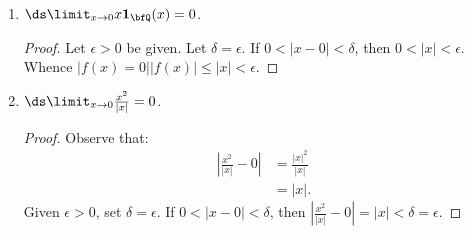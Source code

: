 \documentclass[11pt,twoside,openany]{memoir}
\begin{document}
\begin{exercise}
\begin{enumerate}[label = (\alph*)]
\begin{proof}
\begin{equation*}
\begin{split}
                                & = \left|\frac{x+1}{x+3}\right|\cdot |x-6|.
                            \end{split}
                            \end{equation*}
                        If $|x-6| < 1$, then $6 < x+1 < 8$ and $\frac{1}{8} > \frac{1}{x+1} > \frac{1}{11}$. Thus:
                            \begin{equation*}
                            \begin{split}
                                \left|\frac{x+1}{x+3}\right|\cdot |x-6| 
                                & < \frac{8}{8}|x-6| \\
                                & = |x-6|.
                            \end{split}
                            \end{equation*}
                        Formally, given $\epsilon > 0$, let $\delta = \min\{1,\epsilon\}$. If $0 < |x-6|< \delta$, then by the work above $|f(x) - L| < \epsilon$.
                    \end{proof}
                \item $\ds \limit_{x \rightarrow 0}x\mathbf{1}_\bfQ(x) = 0$.
                    \begin{proof}
                        Let $\epsilon > 0$ be given. Let $\delta = \epsilon$. If $0 < |x - 0| < \delta$, then $0 < |x| < \epsilon$. Whence $|f(x) = 0| |f(x)| \leq |x| < \epsilon$.
                    \end{proof}
                \item $\ds \limit_{x \rightarrow 0} \frac{x^2}{|x|} = 0$.
                    \begin{proof}
                        Observe that:
                            \begin{equation*}
                            \begin{split}
                                \left|\frac{x^2}{|x|} - 0\right| 
                                & = \frac{|x|^2}{|x|} \\
                                & = |x|.
                            \end{split}
                            \end{equation*}
                        Given $\epsilon > 0$, set $\delta = \epsilon$. If $0 < |x-0| < \delta$, then $\left|\frac{x^2}{|x|} - 0\right| = |x| <\delta =  \epsilon$.
                    \end{proof}
            \end{enumerate}
    \end{exercise}
\end{document}
